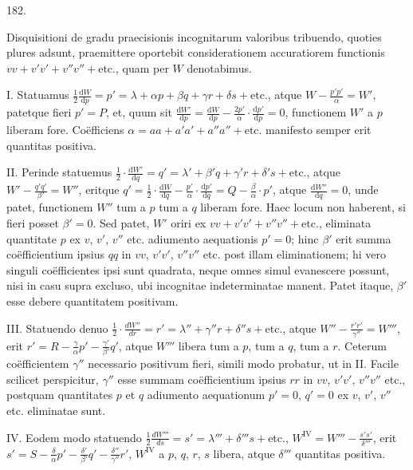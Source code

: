 \begin{center}\hypertarget{native-254-article182}{}182.\end{center}
Disquisitioni de gradu praecisionis incognitarum valoribus tribuendo,
quoties plures adsunt, praemittere oportebit considerationem accuratiorem
functionis $vv+v'v'+v''v''+\text{etc.}$, quam per $W$ denotabimus.

I. Statuamus $\tfrac12\frac{\mathrm{d}W}{\mathrm{d}p}=p'
=\lambda+\alpha p+\beta q+\gamma r+\delta s+\text{etc.}$, atque
$W-\frac{p'p'}{\alpha}=W'$, patetque fieri $p'=P$, et,
quum sit $\frac{\mathrm{d}W'}{\mathrm{d}p}=\frac{\mathrm{d}W}{\mathrm{d}p}
-\frac{2p'}{\alpha}\cdot\frac{\mathrm{d}p'}{\mathrm{d}p}=0$, functionem
$W'$ a $p$ liberam fore. Coëfficiens $\alpha=aa+a'a'+a''a''+\text{etc.}$
manifesto semper erit quantitas positiva.

II. Perinde statuemus $\tfrac12\cdot\frac{\mathrm{d}W'}{\mathrm{d}q}=q'
=\lambda'+\beta'q+\gamma'r+\delta's+\text{etc.}$, atque
$W'-\frac{q'q'}{\beta'}=W''$, eritque
$q'=\tfrac12\cdot\frac{\mathrm{d}W}{\mathrm{d}q}
-\frac{p'}{\alpha}\cdot\frac{\mathrm{d}p'}{\mathrm{d}q}
=Q-\frac{\beta}{\alpha}\cdot p'$, atque
$\frac{\mathrm{d}W''}{\mathrm{d}q}=0$, unde patet, functionem $W''$ tum a
$p$ tum a $q$ liberam fore. Haec locum non haberent, si fieri posset
$\beta'=0$. Sed patet, $W'$ oriri ex $vv+v'v'+v''v''+\text{etc.}$,
eliminata quantitate $p$ ex $v$, $v'$, $v''$ etc. adiumento aequationis
$p'=0$; hinc $\beta'$ erit summa coëfficientium ipsius $qq$ in $vv$,
$v'v'$, $v''v''$ etc. post illam eliminationem; hi vero singuli
coëfficientes ipsi sunt quadrata, neque omnes simul evanescere possunt,
nisi in casu supra excluso, ubi incognitae indeterminatae manent. Patet
itaque, $\beta'$ esse debere quantitatem positivam.

III. Statuendo denuo $\tfrac12\cdot\frac{dW''}{dr}=r'
=\lambda''+\gamma''r+\delta''s+\text{etc.}$, atque
$W''-\frac{r'r'}{\gamma''}=W'''$, erit
$r'=R-\frac{\gamma}{\alpha}p'-\frac{\gamma'}{\beta'}q'$, atque $W'''$
libera tum a $p$, tum a $q$, tum a $r$. Ceterum coëfficientem $\gamma''$
necessario positivum fieri, simili modo probatur, ut in II. Facile
scilicet perspicitur, $\gamma''$ esse summam coëfficientium ipsius $rr$ in
$vv$, $v'v'$, $v''v''$ etc., postquam quantitates $p$ et $q$ adiumento
aequationum $p'=0$, $q'=0$ ex $v$, $v'$, $v''$ etc. eliminatae sunt.

IV. Eodem modo statuendo $\tfrac12\frac{dW'''}{ds}=s'
=\lambda'''+\delta'''s+\text{etc.}$,
$W^{\mathrm{IV}}=W'''-\frac{s's'}{\delta'''}$, erit
$s'=S-\frac{\delta}{\alpha}p'-\frac{\delta'}{\beta'}q'-\frac{\delta''}{\gamma''}r'$,
$W^{\mathrm{IV}}$ a $p$, $q$, $r$, $s$ libera, atque $\delta'''$ quantitas positiva.

